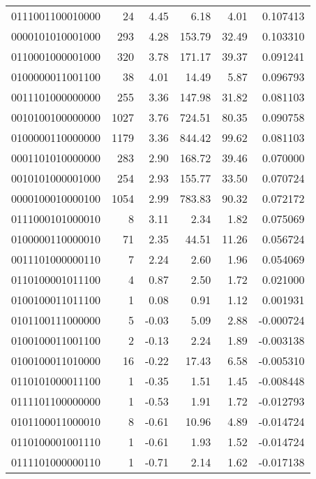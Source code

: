 \begin{tabular}{lrrrrr}
0111001100010000 &        24 &      4.45 &     6.18 &     4.01 &  0.107413 \\
0000101010001000 &       293 &      4.28 &   153.79 &    32.49 &  0.103310 \\
0110001000001000 &       320 &      3.78 &   171.17 &    39.37 &  0.091241 \\
0100000011001100 &        38 &      4.01 &    14.49 &     5.87 &  0.096793 \\
0011101000000000 &       255 &      3.36 &   147.98 &    31.82 &  0.081103 \\
0010100100000000 &      1027 &      3.76 &   724.51 &    80.35 &  0.090758 \\
0100000110000000 &      1179 &      3.36 &   844.42 &    99.62 &  0.081103 \\
0001101010000000 &       283 &      2.90 &   168.72 &    39.46 &  0.070000 \\
0010101000001000 &       254 &      2.93 &   155.77 &    33.50 &  0.070724 \\
0000100010000100 &      1054 &      2.99 &   783.83 &    90.32 &  0.072172 \\
0111000101000010 &         8 &      3.11 &     2.34 &     1.82 &  0.075069 \\
0100000110000010 &        71 &      2.35 &    44.51 &    11.26 &  0.056724 \\
0011101000000110 &         7 &      2.24 &     2.60 &     1.96 &  0.054069 \\
0110100001011100 &         4 &      0.87 &     2.50 &     1.72 &  0.021000 \\
0100100011011100 &         1 &      0.08 &     0.91 &     1.12 &  0.001931 \\
0101100111000000 &         5 &     -0.03 &     5.09 &     2.88 & -0.000724 \\
0100100011001100 &         2 &     -0.13 &     2.24 &     1.89 & -0.003138 \\
0100100011010000 &        16 &     -0.22 &    17.43 &     6.58 & -0.005310 \\
0110101000011100 &         1 &     -0.35 &     1.51 &     1.45 & -0.008448 \\
0111101100000000 &         1 &     -0.53 &     1.91 &     1.72 & -0.012793 \\
0101100011000010 &         8 &     -0.61 &    10.96 &     4.89 & -0.014724 \\
0110100001001110 &         1 &     -0.61 &     1.93 &     1.52 & -0.014724 \\
0111101000000110 &         1 &     -0.71 &     2.14 &     1.62 & -0.017138 \\

\end{tabular}
